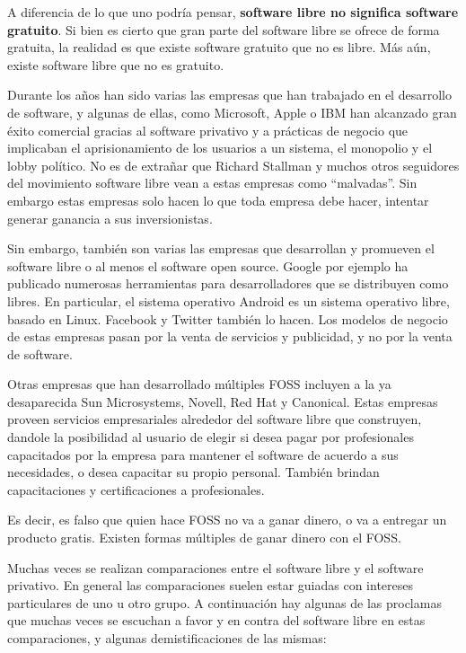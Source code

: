 A diferencia de lo que uno podría pensar, \textbf{software libre no significa
software gratuito}. Si bien es cierto que gran parte del software libre se
ofrece de forma gratuita, la realidad es que existe software gratuito que no es
libre. Más aún, existe software libre que no es gratuito.

Durante los años han sido varias las empresas que han trabajado en el desarrollo
de software, y algunas de ellas, como Microsoft, Apple o IBM han alcanzado gran
éxito comercial gracias al software privativo y a prácticas de negocio que
implicaban el aprisionamiento de los usuarios a un sistema, el monopolio y el
lobby político. No es de extrañar que Richard Stallman y muchos otros seguidores
del movimiento software libre vean a estas empresas como ``malvadas''. Sin
embargo estas empresas solo hacen lo que toda empresa debe hacer, intentar
generar ganancia a sus inversionistas.

Sin embargo, también son varias las empresas que desarrollan y promueven el
software libre o al menos el software open source. Google por ejemplo ha
publicado numerosas herramientas para desarrolladores que se distribuyen como
libres. En particular, el sistema operativo Android es un sistema operativo
libre, basado en Linux. Facebook y Twitter también lo hacen. Los modelos de
negocio de estas empresas pasan por la venta de servicios y publicidad, y no por
la venta de software.

Otras empresas que han desarrollado múltiples FOSS incluyen a la ya desaparecida
Sun Microsystems, Novell, Red Hat y Canonical. Estas empresas proveen servicios
empresariales alrededor del software libre que construyen, dandole la
posibilidad al usuario de elegir si desea pagar por profesionales capacitados
por la empresa para mantener el software de acuerdo a sus necesidades, o desea
capacitar su propio personal. También brindan capacitaciones y certificaciones a
profesionales.

Es decir, es falso que quien hace FOSS no va a ganar dinero, o va a entregar un
producto gratis. Existen formas múltiples de ganar dinero con el FOSS.

Muchas veces se realizan comparaciones entre el software libre y el software
privativo. En general las comparaciones suelen estar guiadas con intereses
particulares de uno u otro grupo. A continuación hay algunas de las proclamas
que muchas veces se escuchan a favor y en contra del software libre en estas
comparaciones, y algunas demistificaciones de las mismas:

